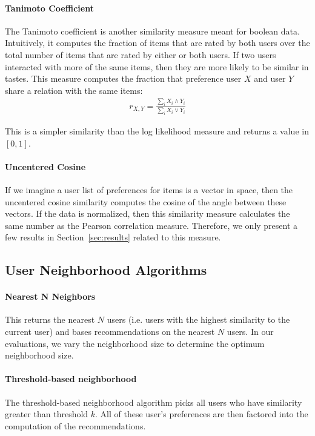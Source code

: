 \documentclass{article}
\begin{document}
\paragraph{Tanimoto Coefficient}

The Tanimoto coefficient is another similarity measure meant for boolean
data. Intuitively, it computes the fraction of items that are rated
by both users over the total number of items that are rated by 
either or both users. If two users interacted with more of the
same items, then they are more likely to be similar in tastes. This measure computes the
fraction that preference user $X$ and user $Y$ share a relation with the same items:\begin{align*}
r_{X, Y} = \frac{\sum_i X_i \wedge Y_i}{\sum_i X_i \vee Y_i}
\end{align*}

This is a simpler similarity than the log likelihood measure and returns a value in $[0, 1]$. 

\paragraph{Uncentered Cosine}

If we imagine a user list of preferences for items is a vector in space, then the uncentered cosine similarity computes
the cosine of the angle between these vectors. If the data is normalized, then this similarity measure calculates the
same number as the Pearson correlation measure. Therefore, we only present a few results in Section~\ref{sec:results} related to this measure.

\subsection{User Neighborhood Algorithms}

\paragraph{Nearest N Neighbors} This returns the nearest $N$ users (i.e. users with the highest similarity to the current
user) and bases recommendations on the nearest $N$ users. In our evaluations, we vary the neighborhood size to 
determine the optimum neighborhood size. 

\paragraph{Threshold-based neighborhood} The threshold-based neighborhood algorithm picks all users who have similarity greater than threshold $k$. All of these user's preferences are then factored into the computation of the recommendations.
\end{document}
